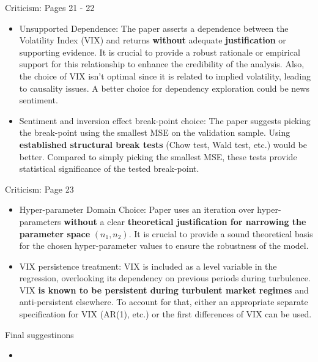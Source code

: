\documentclass{beamer}
\begin{document}
\begin{frame}{Criticism: Pages 21 - 22}
    \begin{itemize}
        \item Unsupported Dependence: The paper asserts a dependence between the Volatility Index (VIX) and returns \textbf{without} adequate \textbf{justification} or supporting evidence. It is crucial to provide a robust rationale or empirical support for this relationship to enhance the credibility of the analysis. Also, the choice of VIX isn't optimal since it is related to implied volatility, leading to causality issues. A better choice for dependency exploration could be news sentiment.

        \item Sentiment and inversion effect break-point choice: The paper suggests picking the break-point using the smallest MSE on the validation sample. Using \textbf{established structural break tests} (Chow test, Wald test, etc.) would be better. Compared to simply picking the smallest MSE, these tests provide statistical significance of the tested break-point.
    \end{itemize}
\end{frame}

\begin{frame}{Criticism: Page 23}
    \begin{itemize}
        
        \item Hyper-parameter Domain Choice: Paper uses an iteration over hyper-parameters \textbf{without} a clear \textbf{theoretical justification for narrowing the parameter space} $(n_1, n_2)$. It is crucial to provide a sound theoretical basis for the chosen hyper-parameter values to ensure the robustness of the model.
        
        \item VIX persistence treatment: VIX is included as a level variable in the regression, overlooking its dependency on previous periods during turbulence. VIX \textbf{is known to be persistent during turbulent market regimes} and anti-persistent elsewhere. To account for that, either an appropriate separate specification for VIX (AR(1), etc.) or the first differences of VIX can be used.
    \end{itemize}
\end{frame}

\begin{frame}{Final suggestinons }
    \begin{itemize}
        
        \item 
        
    \end{itemize}
\end{frame}
\end{document}
